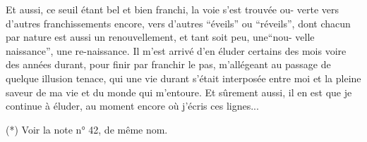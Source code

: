 Et aussi, ce seuil étant bel et bien franchi, la voie s'est trouvée ou-\linebreak
verte vers d'autres franchissements encore, vers d'autres ``éveils'' ou ``réveils'',
dont chacun par nature est aussi un renouvellement, et tant soit peu, une\unsure{:}``nou-\linebreak
velle naissance'', une re-naissance. Il m'est arrivé d'en éluder certains des mois
voire des années durant, pour finir par franchir le pas, m'allégeant au passage
de quelque illusion tenace, qui une vie durant s'était interposée entre moi et
la pleine saveur de ma vie et du monde qui m'entoure. Et sûrement aussi, il en
est que je continue à éluder, au moment encore où j'écris ces lignes...

(*) Voir la note n° 42, de même nom.
